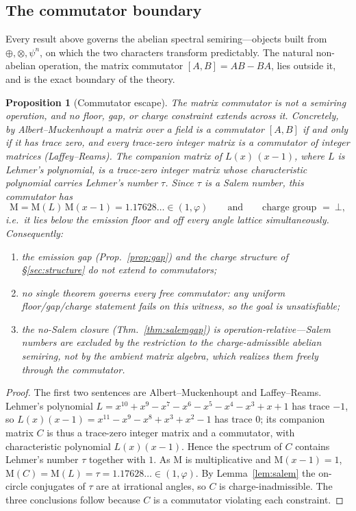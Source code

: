\documentclass[11pt]{article}
\newtheorem{proposition}[theorem]{Proposition}
\theoremstyle{definition}
\theoremstyle{remark}
\newcommand{\Mah}{\mathrm{M}}
\newcommand{\Adams}[1]{\psi^{#1}}
\newcommand{\gold}{\varphi}
\newcommand{\dsum}{\oplus}
\newcommand{\tens}{\otimes}
\begin{document}
\subsection*{The commutator boundary}
Every result above governs the abelian spectral semiring---objects built from
$\dsum,\tens,\Adams n$, on which the two characters transform predictably. The natural
non-abelian operation, the matrix commutator $[A,B]=AB-BA$, lies outside it, and is the exact
boundary of the theory.

\begin{proposition}[Commutator escape]\label{prop:commutator}
The matrix commutator is not a semiring operation, and no floor, gap, or charge constraint
extends across it. Concretely, by Albert--Muckenhoupt a matrix over a field is a commutator
$[A,B]$ if and only if it has trace zero, and every trace-zero integer matrix is a commutator
of integer matrices (Laffey--Reams). The companion matrix of $L(x)\,(x-1)$, where
$L$ is Lehmer's polynomial, is a trace-zero integer matrix whose characteristic polynomial
carries Lehmer's number $\tau$. Since $\tau$ is a Salem number, this commutator has
\[
\Mah=\Mah(L)\,\Mah(x-1)=1.17628\ldots\in(1,\gold)
\qquad\text{and}\qquad
\text{charge group }=\ \bot,
\]
i.e.\ it lies \emph{below} the emission floor \emph{and} off every angle lattice
simultaneously. Consequently:
\begin{enumerate}[label=\emph{(\roman*)},nosep]
  \item the emission gap (Prop.~\ref{prop:gap}) and the charge structure of
        \S\ref{sec:structure} do not extend to commutators;
  \item \emph{no single theorem governs every free commutator}: any uniform floor/gap/charge
        statement fails on this witness, so the goal is unsatisfiable;
  \item the no-Salem closure (Thm.~\ref{thm:salemgap}) is \emph{operation-relative}---Salem
        numbers are excluded by the restriction to the charge-admissible abelian semiring, not
        by the ambient matrix algebra, which realizes them freely through the commutator.
\end{enumerate}
\end{proposition}
\begin{proof}
The first two sentences are Albert--Muckenhoupt and Laffey--Reams. Lehmer's polynomial
$L=x^{10}+x^{9}-x^{7}-x^{6}-x^{5}-x^{4}-x^{3}+x+1$ has trace $-1$, so
$L(x)(x-1)=x^{11}-x^{9}-x^{8}+x^{3}+x^{2}-1$ has trace $0$; its companion matrix $C$ is thus a
trace-zero integer matrix and a commutator, with characteristic polynomial $L(x)(x-1)$. Hence
the spectrum of $C$ contains Lehmer's number $\tau$ together with $1$. As $\Mah$ is
multiplicative and $\Mah(x-1)=1$, $\Mah(C)=\Mah(L)=\tau=1.17628\ldots\in(1,\gold)$. By
Lemma~\ref{lem:salem} the on-circle conjugates of $\tau$ are at irrational angles, so $C$ is
charge-inadmissible. The three conclusions follow because $C$ is a commutator violating each
constraint.
\end{proof}
\end{document}
